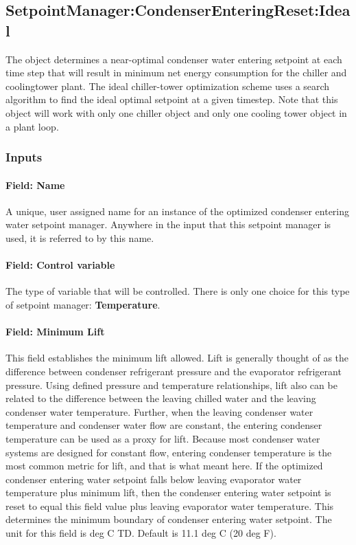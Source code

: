 \subsection{SetpointManager:CondenserEnteringReset:Ideal}\label{setpointmanagercondenserenteringresetideal}

The object determines a near-optimal condenser water entering setpoint at each time step that will result in minimum net energy consumption for the chiller and coolingtower plant. The ideal chiller-tower optimization scheme uses a search algorithm to find the ideal optimal setpoint at a given timestep. Note that this object will work with only one chiller object and only one cooling tower object in a plant loop.

\subsubsection{Inputs}\label{inputs-24-002}

\paragraph{Field: Name}\label{field-name-24-001}

A unique, user assigned name for an instance of the optimized condenser entering water setpoint manager. Anywhere in the input that this setpoint manager is used, it is referred to by this name.

\paragraph{Field: Control variable}\label{field-control-variable-18}

The type of variable that will be controlled. There is only one choice for this type of setpoint manager: \textbf{Temperature}.

\paragraph{Field: Minimum Lift}\label{field-minimum-lift-1}

This field establishes the minimum lift allowed. Lift is generally thought of as the difference between condenser refrigerant pressure and the evaporator refrigerant pressure. Using defined pressure and temperature relationships, lift also can be related to the difference between the leaving chilled water and the leaving condenser water temperature. Further, when the leaving condenser water temperature and condenser water flow are constant, the entering condenser temperature can be used as a proxy for lift. Because most condenser water systems are designed for constant flow, entering condenser temperature is the most common metric for lift, and that is what meant here. If the optimized condenser entering water setpoint falls below leaving evaporator water temperature plus minimum lift, then the condenser entering water setpoint is reset to equal this field value plus leaving evaporator water temperature. This determines the minimum boundary of condenser entering water setpoint. The unit for this field is deg C TD. Default is 11.1 deg C (20 deg F).

